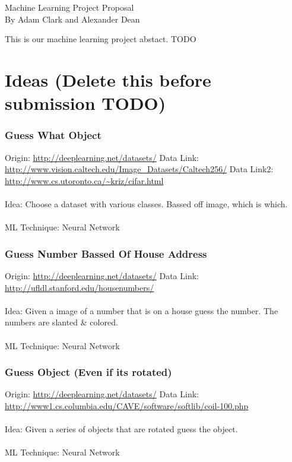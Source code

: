 \documentclass[14pt, letterpaper]{extarticle}
\begin{document}
        \LARGE \center
        Machine Learning Project Proposal\\
        \normalsize
        By Adam Clark and Alexander Dean

        \vspace{\fill}
        \flushleft
        This is our machine learning project abstact. TODO
        \pagebreak

        \section{Ideas (Delete this before submission TODO)}
            \subsubsection{Guess What Object}
            Origin: \url{http://deeplearning.net/datasets/}
            Data Link: \url{http://www.vision.caltech.edu/Image_Datasets/Caltech256/}
            Data Link2:\url{ http://www.cs.utoronto.ca/~kriz/cifar.html}
            \\~\\
            Idea: Choose a dataset with various classes. Bassed off image, which is which.
            \\~\\
            ML Technique: Neural Network

            \subsubsection{Guess Number Bassed Of House Address}
            Origin: \url{http://deeplearning.net/datasets/}
            Data Link: \url{http://ufldl.stanford.edu/housenumbers/}
            \\~\\
            Idea: Given a image of a number that is on a house guess the number. The numbers are slanted \& colored.
            \\~\\
            ML Technique: Neural Network

            \subsubsection{Guess Object (Even if its rotated)}
            Origin: \url{http://deeplearning.net/datasets/}
            Data Link: \url{http://www1.cs.columbia.edu/CAVE/software/softlib/coil-100.php}
            \\~\\
            Idea: Given a series of objects that are rotated guess the object.
            \\~\\
            ML Technique: Neural Network
\end{document}
